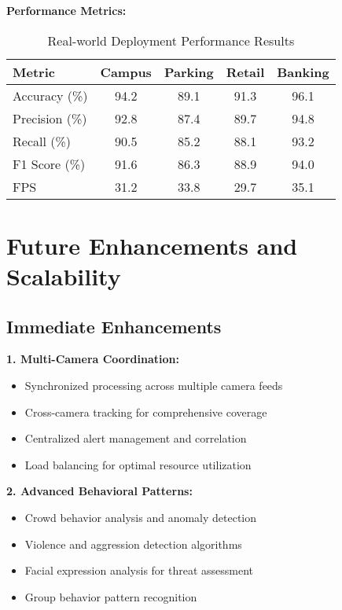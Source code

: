 \documentclass[12pt,a4paper]{article}
\begin{document}
\textbf{Performance Metrics:}
\begin{table}[H]
\centering
\begin{tabular}{@{}lcccc@{}}
\toprule
\textbf{Metric} & \textbf{Campus} & \textbf{Parking} & \textbf{Retail} & \textbf{Banking} \\
\midrule
Accuracy (\%) & 94.2 & 89.1 & 91.3 & 96.1 \\
Precision (\%) & 92.8 & 87.4 & 89.7 & 94.8 \\
Recall (\%) & 90.5 & 85.2 & 88.1 & 93.2 \\
F1 Score (\%) & 91.6 & 86.3 & 88.9 & 94.0 \\
FPS & 31.2 & 33.8 & 29.7 & 35.1 \\
\bottomrule
\end{tabular}
\caption{Real-world Deployment Performance Results}
\label{tab:realworld}
\end{table}

\section{Future Enhancements and Scalability}

\subsection{Immediate Enhancements}

\textbf{1. Multi-Camera Coordination:}
\begin{itemize}
    \item Synchronized processing across multiple camera feeds
    \item Cross-camera tracking for comprehensive coverage
    \item Centralized alert management and correlation
    \item Load balancing for optimal resource utilization
\end{itemize}

\textbf{2. Advanced Behavioral Patterns:}
\begin{itemize}
    \item Crowd behavior analysis and anomaly detection
    \item Violence and aggression detection algorithms
    \item Facial expression analysis for threat assessment
    \item Group behavior pattern recognition
\end{itemize}
\end{document}
